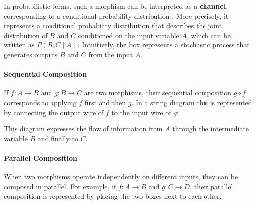 \documentclass[a4paper]{report}
\begin{document}
In probabilistic terms, such a morphism can be interpreted as a \textbf{channel}, corresponding to a conditional probability distribution \cite{markov-kernel-cat, cho2019disintegration}. More precisely, it represents a conditional probability distribution that describes the joint distribution of $B$ and $C$ conditioned on the input variable $A$, which can be written as $P(B,C \mid A)$. Intuitively, the box represents a stochastic process that generates outputs $B$ and $C$ from the input $A$.

\paragraph{Sequential Composition}

If $f : A \rightarrow B$ and $g : B \rightarrow C$ are two morphisms, their 
sequential composition $g \circ f$ corresponds to applying $f$ first and then 
$g$. In a string diagram this is represented by connecting the output wire of 
$f$ to the input wire of $g$:

\begin{center}
\end{center}

This diagram expresses the flow of information from $A$ through the intermediate 
variable $B$ and finally to $C$.

\paragraph{Parallel Composition}

When two morphisms operate independently on different inputs, they can be 
composed in parallel. For example, if $f : A \rightarrow B$ and $g : C \rightarrow D$, 
their parallel composition is represented by placing the two boxes next to each 
other:

\begin{center}
\end{center}
\end{document}
